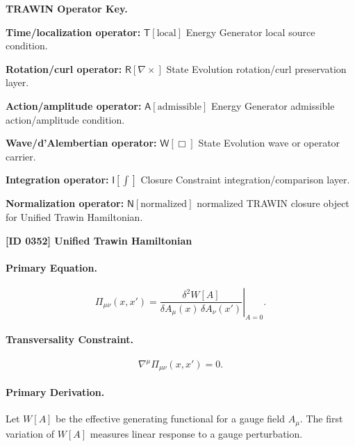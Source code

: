 \par\vspace{0.45\baselineskip}
\noindent\begin{minipage}[t]{\linewidth}
\begingroup
\small
\raggedright
\textbf{TRAWIN Operator Key.}\par
\noindent\textbf{Time/localization operator:} $\mathsf{T}\!\left[\mathrm{local}\right]$ Energy Generator local source condition.\par
\noindent\textbf{Rotation/curl operator:} $\mathsf{R}\!\left[\nabla\times\right]$ State Evolution rotation/curl preservation layer.\par
\noindent\textbf{Action/amplitude operator:} $\mathsf{A}\!\left[\mathrm{admissible}\right]$ Energy Generator admissible action/amplitude condition.\par
\noindent\textbf{Wave/d'Alembertian operator:} $\mathsf{W}\!\left[\Box\right]$ State Evolution wave or operator carrier.\par
\noindent\textbf{Integration operator:} $\mathsf{I}\!\left[\int\right]$ Closure Constraint integration/comparison layer.\par
\noindent\textbf{Normalization operator:} $\mathsf{N}\!\left[\mathrm{normalized}\right]$ normalized TRAWIN closure object for Unified Trawin Hamiltonian.\par
\endgroup
\end{minipage}

\clearpage
\noindent\textbf{[ID 0352] Unified Trawin Hamiltonian}\par
\vspace{0.35em}
\paragraph{Primary Equation.}
\begin{equation}
\Pi_{\mu\nu}(x,x')
=
\left.
\frac{\delta^2 W[A]}
{\delta A_\mu(x)\,\delta A_\nu(x')}
\right|_{A=0}.
\end{equation}

\paragraph{Transversality Constraint.}
\begin{equation}
\nabla^\mu \Pi_{\mu\nu}(x,x')=0 .
\end{equation}

\paragraph{Primary Derivation.}
Let $W[A]$ be the effective generating functional for a gauge field $A_\mu$.  
The first variation of $W[A]$ measures linear response to a gauge perturbation.

